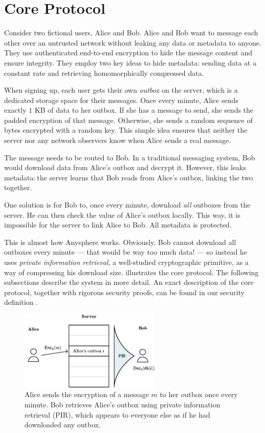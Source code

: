 \section{Core Protocol}
\label{sec:coreprotocol}

Consider two fictional users, Alice and Bob. Alice and Bob want to message each other over an untrusted network without leaking any data or metadata to anyone. They use authenticated end-to-end encryption to hide the message content and ensure integrity. They employ two key ideas to hide metadata: sending data at a constant rate and retrieving homomorphically compressed data.

When signing up, each user gets their own \textit{outbox} on the server, which is a dedicated storage space for their messages. Once every minute, Alice sends exactly $1$ KB of data to her outbox. If she has a message to send, she sends the padded encryption of that message. Otherwise, she sends a random sequence of bytes encrypted with a random key. This simple idea ensures that neither the server nor any network observers know when Alice sends a real message.

The message needs to be routed to Bob. In a traditional messaging system, Bob would download data from Alice's outbox and decrypt it. However, this leaks metadata:$~$the server learns that Bob reads from Alice's outbox, linking the two together.

One solution is for Bob to, once every minute, download \textit{all} outboxes from the server. He can then check the value of Alice's outbox locally. This way, it is impossible for the server to link Alice to Bob. All metadata is protected.

This is almost how Anysphere works. Obviously, Bob cannot download all outboxes every minute — that would be way too much data! — so instead he uses \textit{private information retrieval}, a well-studied cryptographic primitive, as a way of compressing his download size.  illustrates the core protocol. The following subsections describe the system in more detail. An exact description of the core protocol, together with rigorous security proofs, can be found in our security definition \cite{LAZ22SecDef}.

\begin{figure}
    \centering
    \includegraphics[width=0.6\textwidth]{pirfigure.pdf}
\caption{Alice sends the encryption of a message $m$ to her outbox once every minute. Bob retrieves Alice's outbox using private information retrieval (PIR), which appears to everyone else as if he had downloaded any outbox.}
\label{fig:highlevelpir}
\end{figure}

